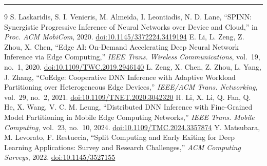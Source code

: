 \documentclass[10pt,a4paper]{article}
\newcommand{\doi}[1]{\href{https://doi.org/#1}{\color{accent}doi:#1}}
\begin{document}
\vspace{-8pt}
{\color{muted}\rule{\textwidth}{0.4pt}}
\vspace{-14pt}
{\scriptsize
\renewcommand{\refname}{}
\begin{thebibliography}{9}\setlength{\itemsep}{0pt}\setlength{\parskip}{0pt}
 S. Laskaridis, S. I. Venieris, M. Almeida, I. Leontiadis, N. D. Lane, ``SPINN: Synergistic Progressive Inference of Neural Networks over Device and Cloud,'' in \emph{Proc. ACM MobiCom}, 2020. \doi{10.1145/3372224.3419194}
 E. Li, L. Zeng, Z. Zhou, X. Chen, ``Edge AI: On-Demand Accelerating Deep Neural Network Inference via Edge Computing,'' \emph{IEEE Trans. Wireless Communications}, vol.~19, no.~1, 2020. \doi{10.1109/TWC.2019.2946140}
 L. Zeng, X. Chen, Z. Zhou, L. Yang, J. Zhang, ``CoEdge: Cooperative DNN Inference with Adaptive Workload Partitioning over Heterogeneous Edge Devices,'' \emph{IEEE/ACM Trans. Networking}, vol.~29, no.~2, 2021. \doi{10.1109/TNET.2020.3042320}
 H. Li, X. Li, Q. Fan, Q. He, X. Wang, V. C. M. Leung, ``Distributed DNN Inference with Fine-Grained Model Partitioning in Mobile Edge Computing Networks,'' \emph{IEEE Trans. Mobile Computing}, vol.~23, no.~10, 2024. \doi{10.1109/TMC.2024.3357874}
 Y. Matsubara, M. Levorato, F. Restuccia, ``Split Computing and Early Exiting for Deep Learning Applications: Survey and Research Challenges,'' \emph{ACM Computing Surveys}, 2022. \doi{10.1145/3527155}
\end{thebibliography}}
\end{document}
